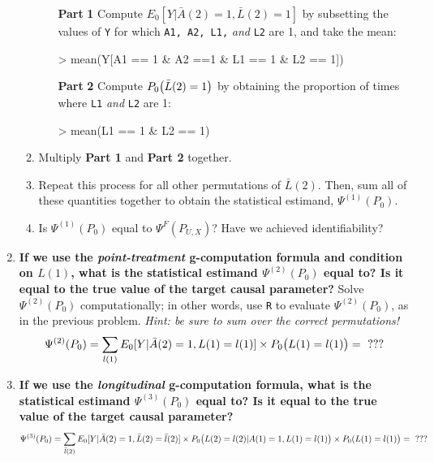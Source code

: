 \documentclass[answers]{exam}
\begin{document}
\begin{enumerate}
\begin{enumerate}
\vspace{4mm}
\begin{itemize}
\item[\textbf{Part}] \textbf{1} Compute $E_0[Y|\bar{A}(2)=1, \bar{L}(2) = 1]$ by subsetting the values of \texttt{Y} for which \texttt{A1, A2, L1,} \textit{and} \texttt{L2} are 1, and take the mean:
\vspace{2mm}
\begin{Schunk}
\begin{Sinput}
> mean(Y[A1 == 1 & A2 ==1 & L1 == 1 & L2 == 1])
\end{Sinput}
\end{Schunk}
\vspace{4mm}
\item[\textbf{Part}] \textbf{2} Compute $P_0\big{(}\bar{L}(2) = 1\big{)}$ by obtaining the proportion of times where \texttt{L1} \textit{and} \texttt{L2} are 1: 
\vspace{2mm}
\begin{Schunk}
\begin{Sinput}
> mean(L1 == 1 & L2 == 1)
\end{Sinput}
\end{Schunk}
\vspace{4mm}
\end{itemize}
\item Multiply \textbf{Part 1} and \textbf{Part 2} together.
\item Repeat this process for all other permutations of $\bar{L}(2)$. Then, sum  all of these quantities together to obtain the statistical estimand, $\Psi^{(1)}(P_0)$.
\item Is $\Psi^{(1)}(P_0)$ equal to $\Psi^F(P_{U,X})$? Have we achieved identifiability?
\end{enumerate}


\item \textbf{If we use the \textit{point-treatment} g-computation formula and condition on $L(1)$, what is the statistical estimand $\Psi^{(2)}(P_0)$ equal to? Is it equal to the true value of the target causal parameter?} Solve $\Psi^{(2)}(P_0)$ computationally; in other words, use \texttt{R} to evaluate $\Psi^{(2)}(P_0)$, as in the previous problem. \textit{Hint: be sure to sum over the correct permutations!} 
\[
\Psi^{(2)}(P_0) = \sum_{l(1)}E_0[Y|\bar{A}(2) = 1, L(1) = l(1)] \times P_0\big{(}L(1) = l(1)\big{)} = \text{ ???}
\]



\item \textbf{If we use the \textit{longitudinal} g-computation formula, what is the statistical estimand $\Psi^{(3)}(P_0)$ equal to? Is it equal to the true value of the target causal parameter?} 
\[
\Psi^{(3)}(P_0) = \sum_{\bar{l}(2)}E_0[Y | \bar{A}(2)=1, \bar{L}(2) = \bar{l}(2)] \times P_0\big{(}L(2) = l(2) | A(1)=1, L(1) = l(1)\big{)} \times P_0(L(1) = l(1)\big{)} =  \text{ ???}
\]


\end{enumerate}
\end{document}
